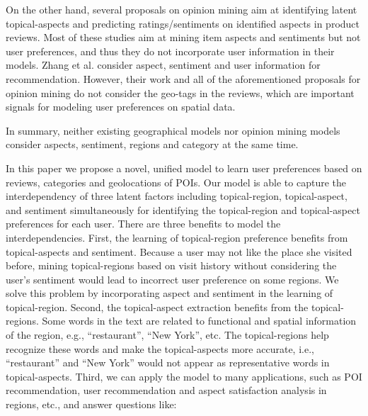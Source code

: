 On the other hand, several
proposals \cite{MeiTSM:2007,TitovMGLDA:2008,TitovMAS:2008,JoASUM:2011}
on opinion mining aim at identifying latent topical-aspects and predicting
ratings/sentiments on identified aspects in product reviews.
Most of these studies aim at mining item aspects and sentiments
but not user preferences,
and thus they do not incorporate user information
in their models.
Zhang et al. \cite{ZhangYF14} consider aspect, sentiment and
user information for recommendation.
However, their work and all of the aforementioned
proposals for opinion mining do not consider the
geo-tags in the reviews, which are important signals
for modeling user preferences on spatial data.

In summary, neither existing geographical models nor opinion mining models
consider aspects, sentiment, regions and category at the
same time.

In this paper we propose a novel, unified model
to learn user preferences based on reviews, categories and geolocations of POIs.
Our model is able
to capture the interdependency of three latent factors including
topical-region,
topical-aspect, and sentiment simultaneously
for identifying the topical-region and topical-aspect preferences
for each user.
There are three benefits to model the interdependencies.
First, the learning of topical-region preference benefits from topical-aspects and sentiment.
Because a user may not like the place she visited before, mining
topical-regions based on visit history without considering
the user's sentiment would lead to incorrect
user preference on some regions. We solve this problem
by incorporating aspect and sentiment in the learning of
topical-region. Second, the topical-aspect extraction benefits
from the topical-regions. Some words in the text are
related to functional and spatial information of the region,
e.g., ``restaurant'', ``New York'', etc. The topical-regions help
recognize these words and make the topical-aspects more
accurate, i.e., ``restaurant'' and ``New York'' would not appear
as representative words in topical-aspects. 
Third, we can apply the model to
many applications, such as POI recommendation, user
recommendation and aspect satisfaction analysis in regions,
etc., and answer questions like:

